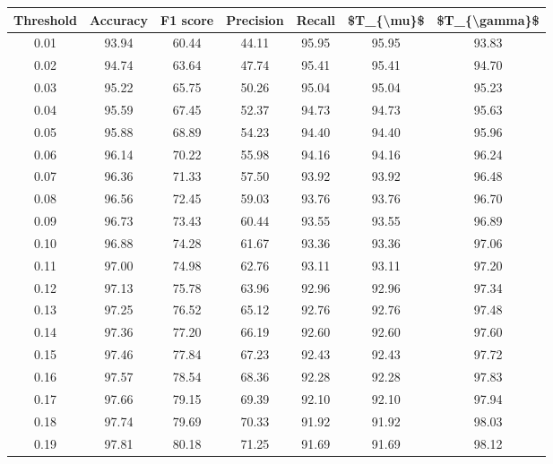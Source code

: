 \begin{tabular}{|c|c|c|c|c|c|c|}
\hline
 Threshold &  Accuracy &  F1 score &  Precision &  Recall &  \$T\_\{\textbackslash mu\}\$ &  \$T\_\{\textbackslash gamma\}\$ \\
\hline
      0.01 &     93.94 &     60.44 &      44.11 &   95.95 &      95.95 &         93.83 \\
      0.02 &     94.74 &     63.64 &      47.74 &   95.41 &      95.41 &         94.70 \\
      0.03 &     95.22 &     65.75 &      50.26 &   95.04 &      95.04 &         95.23 \\
      0.04 &     95.59 &     67.45 &      52.37 &   94.73 &      94.73 &         95.63 \\
      0.05 &     95.88 &     68.89 &      54.23 &   94.40 &      94.40 &         95.96 \\
      0.06 &     96.14 &     70.22 &      55.98 &   94.16 &      94.16 &         96.24 \\
      0.07 &     96.36 &     71.33 &      57.50 &   93.92 &      93.92 &         96.48 \\
      0.08 &     96.56 &     72.45 &      59.03 &   93.76 &      93.76 &         96.70 \\
      0.09 &     96.73 &     73.43 &      60.44 &   93.55 &      93.55 &         96.89 \\
      0.10 &     96.88 &     74.28 &      61.67 &   93.36 &      93.36 &         97.06 \\
      0.11 &     97.00 &     74.98 &      62.76 &   93.11 &      93.11 &         97.20 \\
      0.12 &     97.13 &     75.78 &      63.96 &   92.96 &      92.96 &         97.34 \\
      0.13 &     97.25 &     76.52 &      65.12 &   92.76 &      92.76 &         97.48 \\
      0.14 &     97.36 &     77.20 &      66.19 &   92.60 &      92.60 &         97.60 \\
      0.15 &     97.46 &     77.84 &      67.23 &   92.43 &      92.43 &         97.72 \\
      0.16 &     97.57 &     78.54 &      68.36 &   92.28 &      92.28 &         97.83 \\
      0.17 &     97.66 &     79.15 &      69.39 &   92.10 &      92.10 &         97.94 \\
      0.18 &     97.74 &     79.69 &      70.33 &   91.92 &      91.92 &         98.03 \\
      0.19 &     97.81 &     80.18 &      71.25 &   91.69 &      91.69 &         98.12 \\

\end{tabular}
